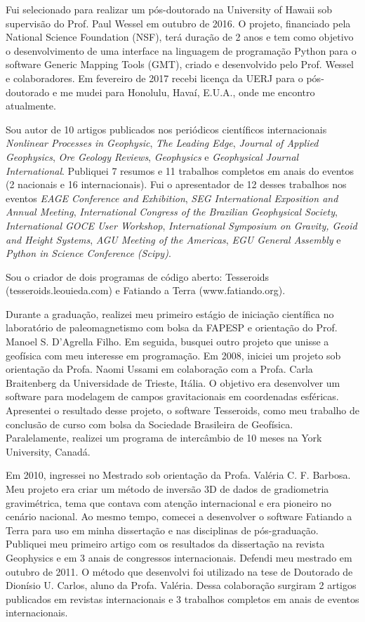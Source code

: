 Fui selecionado para realizar um pós-doutorado na University of Hawaii sob
supervisão do Prof. Paul Wessel em outubro de 2016.
O projeto, financiado pela National Science Foundation (NSF), terá duração de 2
anos e tem como objetivo o desenvolvimento de uma interface na linguagem de
programação Python para o software Generic Mapping Tools (GMT), criado e
desenvolvido pelo Prof. Wessel e colaboradores.
Em fevereiro de 2017 recebi licença da UERJ para o pós-doutorado e me mudei
para Honolulu, Havaí, E.U.A., onde me encontro atualmente.

Sou autor de 10 artigos publicados nos periódicos científicos internacionais
{\em Nonlinear Processes in Geophysic},
{\em The Leading Edge},
{\em Journal of Applied Geophysics},
{\em Ore Geology Reviews},
{\em Geophysics} e
{\em Geophysical Journal International}.
Publiquei 7 resumos e 11 trabalhos completos em anais do eventos (2 nacionais e
16 internacionais).
Fui o apresentador de 12 desses trabalhos nos eventos
{\em EAGE Conference and Exhibition},
{\em SEG International Exposition and Annual Meeting},
{\em International Congress of the Brazilian Geophysical Society},
{\em International GOCE User Workshop},
{\em International Symposium on Gravity, Geoid and Height Systems},
{\em AGU Meeting of the Americas},
{\em EGU General Assembly} e
{\em Python in Science Conference (Scipy)}.


Sou o criador de dois programas de código aberto: Tesseroids
(tesseroids.leouieda.com) e Fatiando a Terra (www.fatiando.org).

Durante a graduação, realizei meu primeiro estágio de iniciação científica no
laboratório de paleomagnetismo com bolsa da FAPESP e orientação do Prof. Manoel
S. D'Agrella Filho. Em seguida, busquei outro projeto que unisse a geofísica
com meu interesse em programação. Em 2008, iniciei um projeto sob orientação da
Profa. Naomi Ussami em colaboração com a Profa. Carla Braitenberg da
Universidade de Trieste, Itália. O objetivo era desenvolver um software para
modelagem de campos gravitacionais em coordenadas esféricas. Apresentei o
resultado desse projeto, o software Tesseroids, como meu trabalho de conclusão
de curso com bolsa da Sociedade Brasileira de Geofísica. Paralelamente,
realizei um programa de intercâmbio de 10 meses na York University, Canadá.

Em 2010, ingressei no Mestrado sob orientação da Profa. Valéria C. F. Barbosa.
Meu projeto era criar um método de inversão 3D de dados de gradiometria
gravimétrica, tema que contava com atenção internacional e era pioneiro no
cenário nacional. Ao mesmo tempo, comecei a desenvolver o software Fatiando a
Terra para uso em minha dissertação e nas disciplinas de pós-graduação.
Publiquei meu primeiro artigo com os resultados da dissertação na revista
Geophysics e em 3 anais de congressos internacionais. Defendi meu mestrado em
outubro de 2011. O método que desenvolvi foi utilizado na tese de Doutorado de
Dionísio U. Carlos, aluno da Profa. Valéria. Dessa colaboração surgiram 2
artigos publicados em revistas internacionais e 3 trabalhos completos em anais
de eventos internacionais.

